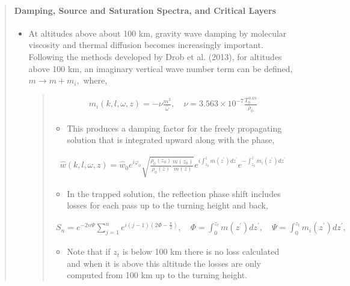 \documentclass[letterpaper,10pt,english]{sphinxmanual}
\begin{document}
\begin{itemize}
\begin{quote}
\paragraph{Damping, Source and Saturation Spectra, and Critical Layers}
\label{\detokenize{gravity:damping-source-and-saturation-spectra-and-critical-layers}}\begin{itemize}
\item {} 
\sphinxAtStartPar
At altitudes above about 100 km, gravity wave damping by molecular viscosity and thermal diffusion becomes increasingly important.  Following the methods developed by Drob et al. (2013), for altitudes above 100 km, an imaginary vertical wave number term can be defined, \(m \rightarrow m + m_i,\) where,
\begin{quote}
\begin{equation*}
\begin{split}m_i \left(k, l, \omega, z \right) = -\nu \frac{m^3}{\hat{\omega}}, \quad \nu = 3.563 \times 10^{-7} \frac{T_0^{\, 0.69}}{\rho_0}\end{split}
\end{equation*}\begin{itemize}
\item {} 
\sphinxAtStartPar
This produces a damping factor for the freely propagating solution that is integrated upward along with the phase,

\end{itemize}
\begin{equation*}
\begin{split}\hat{w} \left( k, l, \omega, z \right) = \hat{w}_0 e^{i \varphi_0} \sqrt{ \frac{\rho_0 \left( z_0 \right)}{\rho_0 \left( z \right)} \frac{m \left( z_0 \right)}{m \left( z \right)}} e^{i \int_{z_0}^z{m \left( z^\prime \right) dz^\prime}} e^{-\int_{z_0}^{z}{m_i \left( z^\prime \right) dz^\prime}}\end{split}
\end{equation*}\begin{itemize}
\item {} 
\sphinxAtStartPar
In the trapped solution, the reflection phase shift includes losses for each pass up to the turning height and back,

\end{itemize}
\begin{equation*}
\begin{split}S_n = e^{-2 n \Psi} \sum_{j = 1}^n{e^{i \left( j -1 \right) \left(2 \Phi - \frac{\pi}{2} \right)}}, \quad \Phi = \int_0^{z_t} m \left( z^\prime \right) d z^\prime, \quad \Psi = \int_0^{z_t} m_i \left( z^\prime \right) d z^\prime,\end{split}
\end{equation*}\begin{itemize}
\item {} 
\sphinxAtStartPar
Note that if \(z_t\) is below 100 km there is no loss calculated and when it is above this altitude the losses are only computed from 100 km up to the turning height.


\end{itemize}
\end{quote}
\end{itemize}
\end{quote}
\end{itemize}
\end{document}
